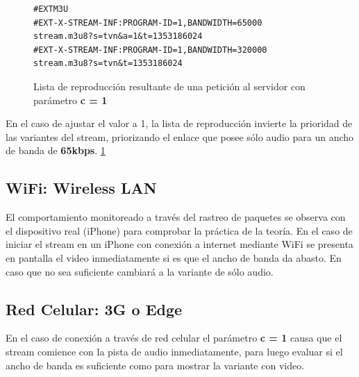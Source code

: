 \begin{figure}[H]
	\centering
\begin{lstlisting}
#EXTM3U
#EXT-X-STREAM-INF:PROGRAM-ID=1,BANDWIDTH=65000
stream.m3u8?s=tvn&a=1&t=1353186024
#EXT-X-STREAM-INF:PROGRAM-ID=1,BANDWIDTH=320000
stream.m3u8?s=tvn&t=1353186024
\end{lstlisting}
\caption{Lista de reproducción resultante de una petición al servidor con parámetro \textbf{c = 1}}
\label{lst:playlistc1}
\end{figure}

En el caso de ajustar el valor a 1, la lista de reproducción invierte la prioridad de las variantes del stream, priorizando el enlace que posee sólo audio para un ancho de banda de \textbf{65kbps}. \ref{lst:playlistc1}


  \subsection{WiFi: Wireless LAN}
  El comportamiento monitoreado a través del rastreo de paquetes se observa con el dispositivo real (iPhone) para comprobar la práctica de la teoría.
  En el caso de iniciar el stream en un iPhone con conexión a internet mediante WiFi se presenta en pantalla el video inmediatamente si es que el ancho de banda da abasto. En caso que no sea suficiente cambiará a la variante de sólo audio.
  
  
  

  \subsection{Red Celular: 3G o Edge}
En el caso de conexión a través de red celular el parámetro \textbf{c = 1} causa que el stream comience con la pista de audio inmediatamente, para luego evaluar si el ancho de banda es suficiente como para mostrar la variante con video.

